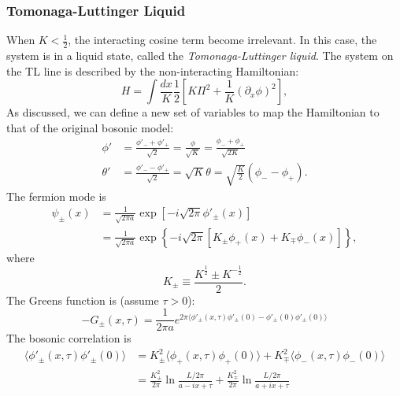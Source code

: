 \documentclass[aps,prb,superscriptaddress,nofootinbib]{revtex4}
\begin{document}
\subsubsection{Tomonaga-Luttinger Liquid}
When $K<\frac{1}{2}$, the interacting cosine term become irrelevant.
In this case, the system is in a liquid state, called the \textit{Tomonaga-Luttinger liquid}.
The system on the TL line is described by the non-interacting Hamiltonian:
\begin{equation}
	H = \int \frac{dx}{K} \frac{1}{2}\left[K \Pi^2 + \frac{1}{K}(\partial_x\phi)^2 \right],
\end{equation}
As discussed, we can define a new set of variables to map the Hamiltonian to that of the original bosonic model:
\begin{equation}
\begin{aligned}
	\phi' &= \frac{\phi'_-+\phi'_+}{\sqrt 2} = \frac{\phi}{\sqrt{K}} = \frac{\phi_-+\phi_+}{\sqrt{2K}} \\
	\theta' &= \frac{\phi'_--\phi'_+}{\sqrt 2} = \sqrt{K} \theta = \sqrt{\frac{K}{2}}(\phi_--\phi_+).
\end{aligned}
\end{equation}
The fermion mode is
\begin{equation}
\begin{aligned}
	\psi_{\pm}(x) &= \frac{1}{\sqrt{2\pi a}} \exp\left[-i\sqrt{2\pi} \phi'_{\pm}(x) \right] \\
	&= \frac{1}{\sqrt{2\pi a}} \exp\left\{-i\sqrt{2\pi} \left[K_\pm \phi_+(x)+ K_\mp \phi_-(x) \right]\right\},
\end{aligned}
\end{equation}
where 
\begin{equation}
	K_\pm \equiv \frac{K^{\frac{1}{2}} \pm K^{-\frac{1}{2}}}{2}.
\end{equation}
The Greens function is (assume $\tau>0$):
\begin{equation}
	-G_{\pm}(x,\tau) 
	= \frac{1}{2\pi a} e^{2\pi \langle \phi'_\pm(x,\tau)\phi'_\pm(0) - \phi'_\pm(0)\phi'_\pm(0) \rangle}
\end{equation}
The bosonic correlation is
\begin{equation}
\begin{aligned}
	\langle \phi'_\pm(x,\tau)\phi'_\pm(0) \rangle
	&= K_\pm^2 \langle \phi_+(x,\tau)\phi_+(0)\rangle + K_\mp^2 \langle\phi_-(x,\tau)\phi_-(0)\rangle \\
	&= \frac{K_\pm^2}{2\pi}\ln \frac{L/2\pi}{a-ix+\tau} + \frac{K_\mp^2}{2\pi}\ln \frac{L/2\pi}{a+ix +\tau}
\end{aligned}
\end{equation}
\end{document}
